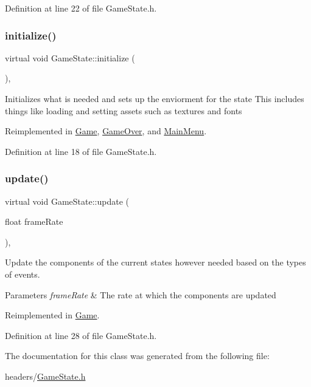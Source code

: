 Definition at line 22 of file Game\+State.\+h.

\mbox{\label{class_game_state_a22d3404f53895a23359557a713194736}} 
\subsubsection{\texorpdfstring{initialize()}{initialize()}}
{\footnotesize\ttfamily virtual void Game\+State\+::initialize (\begin{DoxyParamCaption}{ }\end{DoxyParamCaption})\hspace{0.3cm}{\ttfamily [inline]}, {\ttfamily [virtual]}}

Initializes what is needed and sets up the enviorment for the state This includes things like loading and setting assets such as textures and fonts 

Reimplemented in \mbox{\hyperlink{class_game_ae2cce13c2c6358709513a06932df939a}{Game}}, \mbox{\hyperlink{class_game_over_a973dbbd0bfc74c540b933853202b46a4}{Game\+Over}}, and \mbox{\hyperlink{class_main_menu_a039698cefc631351e79f097c41e39d1c}{Main\+Menu}}.



Definition at line 18 of file Game\+State.\+h.

\mbox{\label{class_game_state_a52648f2b2e90f0e1e41a1763ebb061ba}} 
\subsubsection{\texorpdfstring{update()}{update()}}
{\footnotesize\ttfamily virtual void Game\+State\+::update (\begin{DoxyParamCaption}\item[{float}]{frame\+Rate }\end{DoxyParamCaption})\hspace{0.3cm}{\ttfamily [inline]}, {\ttfamily [virtual]}}

Update the components of the current states however needed based on the types of events. 
\begin{DoxyParams}{Parameters}
{\em frame\+Rate} & The rate at which the components are updated \\
\hline
\end{DoxyParams}


Reimplemented in \mbox{\hyperlink{class_game_a5470c86c0d379e7cb50175b5079fd559}{Game}}.



Definition at line 28 of file Game\+State.\+h.



The documentation for this class was generated from the following file\+:\begin{DoxyCompactItemize}
\item 
headers/\mbox{\hyperlink{_game_state_8h}{Game\+State.\+h}}\end{DoxyCompactItemize}
